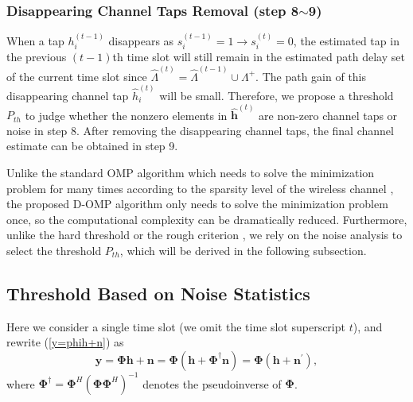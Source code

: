 \documentclass[conference]{IEEEtran}
\begin{document}
\subsubsection{Disappearing Channel Taps Removal (step 8$\sim$9)}
When a tap $h_i^{(t-1)}$ disappears as $s_i^{(t-1)}=1\rightarrow s_i^{(t)}=0$, the estimated tap in the previous $(t-1)$th time slot will still remain in the estimated path delay set of the current time slot since $\hat{\Lambda}^{(t)}=\hat{\Lambda}^{(t-1)}\cup\Lambda^{+}$.
The path gain of this disappearing channel tap $\hat{h}_i^{(t)}$ will be small.
Therefore, we propose a threshold $P_{th}$ to judge whether the nonzero elements in $\hat{\mathbf{h}}^{(t)}$ are non-zero channel taps or noise in step 8.
After removing the disappearing channel taps, the final channel estimate can be obtained in step 9.

Unlike the standard OMP algorithm which needs to solve the minimization problem for many times according to the sparsity level of the wireless channel \cite{GG1}, the proposed D-OMP algorithm only needs to solve the minimization problem once, so the computational complexity can be dramatically reduced. Furthermore, unlike the hard threshold \cite{CSCE} or the rough criterion \cite{A-SOMP}, we rely on the noise analysis to select the threshold $P_{th}$, which will be derived in the following subsection.

\subsection{Threshold Based on Noise Statistics}
Here we consider a single time slot (we omit the time slot superscript $t$), and rewrite (\ref{y=phih+n}) as
\begin{equation}
\label{y=phi(h+n)}
\mathbf{y}=\mathbf{\Phi}\mathbf{h}+\mathbf{n}=\mathbf{\Phi}(\mathbf{h}+\mathbf{\Phi}^{\dag}\mathbf{n})=\mathbf{\Phi}(\mathbf{h}+\mathbf{n}^{'}),
\end{equation}
where $\mathbf{\Phi}^{\dag}=\mathbf{\Phi}^H(\mathbf{\Phi}\mathbf{\Phi}^H)^{-1}$ denotes the pseudoinverse of $\mathbf{\Phi}$.
\end{document}
